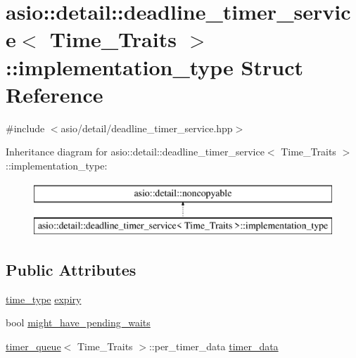 \hypertarget{structasio_1_1detail_1_1deadline__timer__service_1_1implementation__type}{}\section{asio\+:\+:detail\+:\+:deadline\+\_\+timer\+\_\+service$<$ Time\+\_\+\+Traits $>$\+:\+:implementation\+\_\+type Struct Reference}
\label{structasio_1_1detail_1_1deadline__timer__service_1_1implementation__type}


{\ttfamily \#include $<$asio/detail/deadline\+\_\+timer\+\_\+service.\+hpp$>$}

Inheritance diagram for asio\+:\+:detail\+:\+:deadline\+\_\+timer\+\_\+service$<$ Time\+\_\+\+Traits $>$\+:\+:implementation\+\_\+type\+:\begin{figure}[H]
\begin{center}
\leavevmode
\includegraphics[height=2.000000cm]{structasio_1_1detail_1_1deadline__timer__service_1_1implementation__type}
\end{center}
\end{figure}
\subsection*{Public Attributes}
\begin{DoxyCompactItemize}
\item 
\hyperlink{classasio_1_1detail_1_1deadline__timer__service_a217817497abe6136c056c0facdd3f8aa}{time\+\_\+type} \hyperlink{structasio_1_1detail_1_1deadline__timer__service_1_1implementation__type_a7a00fd79c09c0bfe8da3874da7b9df5d}{expiry}
\item 
bool \hyperlink{structasio_1_1detail_1_1deadline__timer__service_1_1implementation__type_aabd663b0730f0997fb20984dc01bccbf}{might\+\_\+have\+\_\+pending\+\_\+waits}
\item 
\hyperlink{classasio_1_1detail_1_1timer__queue}{timer\+\_\+queue}$<$ Time\+\_\+\+Traits $>$\+::per\+\_\+timer\+\_\+data \hyperlink{structasio_1_1detail_1_1deadline__timer__service_1_1implementation__type_a5991f0ea08712c34c7bfe35559749ebe}{timer\+\_\+data}
\end{DoxyCompactItemize}


